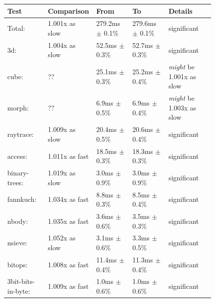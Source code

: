 \documentclass{article}
\begin{document}
\begin{figure}[H]
\begin{tabular}{|l|l|l|l|l|}
\hline
    \textbf{Test}                   & \textbf{Comparison}       &     \textbf{From}         &        \textbf{To}           &  \textbf{Details} \\
\hline\hline
Total:                 & 1.001x as slow & 279.2ms $\pm$ 0.1\% &  279.6ms $\pm$ 0.1\%   &  significant \\
\hline\hline
3d:                  & 1.004x as slow &  52.5ms $\pm$ 0.3\% &   52.7ms $\pm$ 0.3\%   &  significant \\
\hline\hspace{0.5em} cube:              & ??               &  25.1ms $\pm$ 0.3\% &   25.2ms $\pm$ 0.4\%   &  \textit{might} be 1.001x as slow \\
\hline\hspace{0.5em} morph:             & ??               &   6.9ms $\pm$ 0.5\% &    6.9ms $\pm$ 0.4\%   &  \textit{might} be 1.003x as slow \\
\hline\hspace{0.5em} raytrace:          & 1.009x as slow &  20.4ms $\pm$ 0.5\% &   20.6ms $\pm$ 0.4\%   &  significant \\
\hline\hline
access:              & 1.011x as fast   &  18.5ms $\pm$ 0.3\% &   18.3ms $\pm$ 0.3\%   &  significant \\
\hline\hspace{0.5em} binary-trees:      & 1.019x as slow &   3.0ms $\pm$ 0.9\% &    3.0ms $\pm$ 0.9\%   &  significant \\
\hline\hspace{0.5em} fannkuch:          & 1.034x as fast   &   8.8ms $\pm$ 0.3\% &    8.5ms $\pm$ 0.4\%   &  significant \\
\hline\hspace{0.5em} nbody:             & 1.035x as fast   &   3.6ms $\pm$ 0.6\% &    3.5ms $\pm$ 0.3\%   &  significant \\
\hline\hspace{0.5em} nsieve:            & 1.052x as slow &   3.1ms $\pm$ 0.6\% &    3.3ms $\pm$ 0.5\%   &  significant \\
\hline\hline
bitops:              & 1.008x as fast   &  11.4ms $\pm$ 0.4\% &   11.3ms $\pm$ 0.4\%   &  significant \\
\hline\hspace{0.5em} 3bit-bits-in-byte: & 1.009x as fast   &   1.0ms $\pm$ 0.6\% &    1.0ms $\pm$ 0.6\%   &  significant \\

\end{tabular}
\end{figure}
\end{document}

